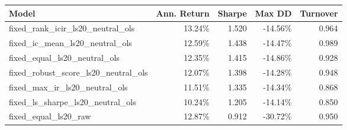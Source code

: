 \begin{tabular}{lrrrr}
\toprule
Model & Ann. Return & Sharpe & Max DD & Turnover \\
\midrule
fixed\_rank\_icir\_ls20\_neutral\_ols & 13.24\% & 1.520 & -14.56\% & 0.964 \\
fixed\_ic\_mean\_ls20\_neutral\_ols & 12.59\% & 1.438 & -14.47\% & 0.989 \\
fixed\_equal\_ls20\_neutral\_ols & 12.35\% & 1.415 & -14.86\% & 0.928 \\
fixed\_robust\_score\_ls20\_neutral\_ols & 12.07\% & 1.398 & -14.28\% & 0.948 \\
fixed\_max\_ir\_ls20\_neutral\_ols & 11.51\% & 1.335 & -14.34\% & 0.868 \\
fixed\_ls\_sharpe\_ls20\_neutral\_ols & 10.24\% & 1.205 & -14.14\% & 0.850 \\
fixed\_equal\_ls20\_raw & 12.87\% & 0.912 & -30.72\% & 0.950 \\
\bottomrule
\end{tabular}
